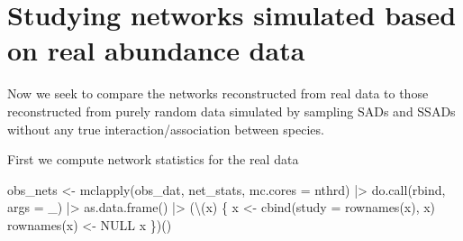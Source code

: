 \documentclass[
  letterpaper,
  DIV=11,
  numbers=noendperiod]{scrartcl}
\newenvironment{Shaded}{\begin{snugshade}}{\end{snugshade}}
\newcommand{\AttributeTok}[1]{\textcolor[rgb]{0.40,0.45,0.13}{#1}}
\newcommand{\ConstantTok}[1]{\textcolor[rgb]{0.56,0.35,0.01}{#1}}
\newcommand{\FunctionTok}[1]{\textcolor[rgb]{0.28,0.35,0.67}{#1}}
\newcommand{\NormalTok}[1]{\textcolor[rgb]{0.00,0.23,0.31}{#1}}
\newcommand{\OtherTok}[1]{\textcolor[rgb]{0.00,0.23,0.31}{#1}}
\newcommand{\SpecialCharTok}[1]{\textcolor[rgb]{0.37,0.37,0.37}{#1}}
\begin{document}
\section{Studying networks simulated based on real abundance
data}\label{studying-networks-simulated-based-on-real-abundance-data}

Now we seek to compare the networks reconstructed from real data to
those reconstructed from purely random data simulated by sampling SADs
and SSADs without any true interaction/association between species.

First we compute network statistics for the real data

\begin{Shaded}
\begin{Highlighting}[]
\NormalTok{obs\_nets }\OtherTok{\textless{}{-}} \FunctionTok{mclapply}\NormalTok{(obs\_dat, net\_stats, }\AttributeTok{mc.cores =}\NormalTok{ nthrd) }\SpecialCharTok{|\textgreater{}} 
    \FunctionTok{do.call}\NormalTok{(rbind, }\AttributeTok{args =}\NormalTok{ \_) }\SpecialCharTok{|\textgreater{}} 
    \FunctionTok{as.data.frame}\NormalTok{() }\SpecialCharTok{|\textgreater{}} 
\NormalTok{    (\textbackslash{}(x) \{}
\NormalTok{        x }\OtherTok{\textless{}{-}} \FunctionTok{cbind}\NormalTok{(}\AttributeTok{study =} \FunctionTok{rownames}\NormalTok{(x), x)}
        \FunctionTok{rownames}\NormalTok{(x) }\OtherTok{\textless{}{-}} \ConstantTok{NULL}
\NormalTok{        x}
\NormalTok{    \})()}
\end{Highlighting}
\end{Shaded}
\end{document}
